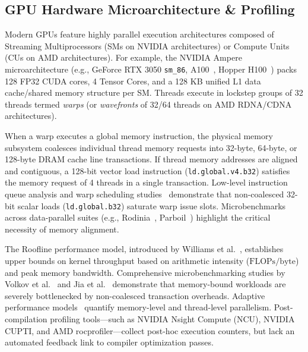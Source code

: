 \documentclass[10pt,journal,compsoc]{IEEEtran}
\begin{document}
\subsection{GPU Hardware Microarchitecture \& Profiling}
Modern GPUs feature highly parallel execution architectures composed of Streaming Multiprocessors (SMs on NVIDIA architectures) or Compute Units (CUs on AMD architectures). For example, the NVIDIA Ampere microarchitecture (e.g., GeForce RTX 3050 \texttt{sm\_86}, A100~\cite{choquette2021nvidia}, Hopper H100~\cite{choquette2023nvidia}) packs 128 FP32 CUDA cores, 4 Tensor Cores, and a 128 KB unified L1 data cache/shared memory structure per SM. Threads execute in lockstep groups of 32 threads termed \textit{warps} (or \textit{wavefronts} of 32/64 threads on AMD RDNA/CDNA architectures).

When a warp executes a global memory instruction, the physical memory subsystem coalesces individual thread memory requests into 32-byte, 64-byte, or 128-byte DRAM cache line transactions. If thread memory addresses are aligned and contiguous, a 128-bit vector load instruction (\texttt{ld.global.v4.b32}) satisfies the memory request of 4 threads in a single transaction. Low-level instruction queue analysis and warp scheduling studies~\cite{kersey2017low} demonstrate that non-coalesced 32-bit scalar loads (\texttt{ld.global.b32}) saturate warp issue slots. Microbenchmarks across data-parallel suites (e.g., Rodinia~\cite{che2009rodinia}, Parboil~\cite{stratton2012parboil}) highlight the critical necessity of memory alignment.

The Roofline performance model, introduced by Williams et al.~\cite{williams2009roofline}, establishes upper bounds on kernel throughput based on arithmetic intensity ($\text{FLOPs/byte}$) and peak memory bandwidth. Comprehensive microbenchmarking studies by Volkov et al.~\cite{volkov2008benchmarking} and Jia et al.~\cite{jia2019dissecting, jia2021dissecting} demonstrate that memory-bound workloads are severely bottlenecked by non-coalesced transaction overheads. Adaptive performance models~\cite{baghsorkhi2010adaptive, hong2009analytical, fang2011comprehensive} quantify memory-level and thread-level parallelism. Post-compilation profiling tools—such as NVIDIA Nsight Compute (NCU), NVIDIA CUPTI, and AMD rocprofiler—collect post-hoc execution counters, but lack an automated feedback link to compiler optimization passes.
\end{document}
